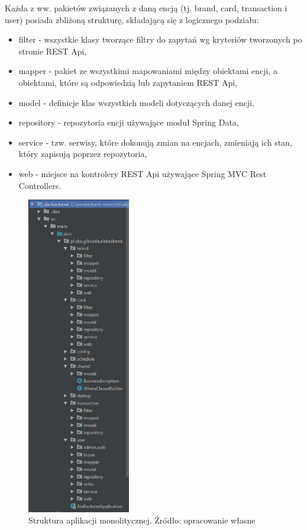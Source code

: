 Każda z ww. pakietów związanych z daną encją (tj. brand, card, transaction i user) posiada zbliżoną strukturę, składającą się z logicznego podziału:
\begin{itemize}
    \item filter - wszystkie klasy tworzące filtry do zapytań wg kryteriów tworzonych po stronie REST Api,
    \item mapper - pakiet ze wszystkimi mapowaniami między obiektami encji, a obiektami, które są odpowiedzią lub zapytaniem REST Api,
    \item model - definicje klas wszystkich modeli dotyczących danej encji,
    \item repository - repozytoria encji używające moduł Spring Data,
    \item service - tzw. serwisy, które dokonują zmian na encjach, zmieniają ich stan, który zapisują poprzez repozytoria,
    \item web - miejsce na kontrolery REST Api używające Spring MVC Rest Controllers.
\end{itemize}
\begin{figure}[!htb]
  \centering
    \includegraphics[width=0.4\textwidth]{images/monolit-structure.PNG}
  \caption{Struktura aplikacji monolitycznej. Źródło: opracowanie własne }
\end{figure}
\FloatBarrier

